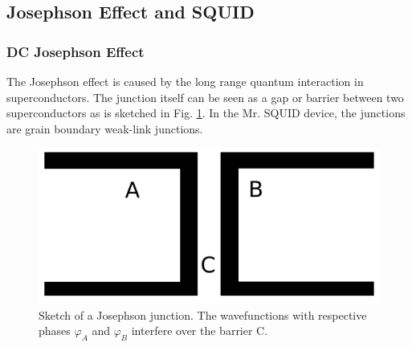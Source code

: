 \documentclass[a4paper,10pt]{article}
\begin{document}
\subsection{Josephson Effect and SQUID} %

\subsubsection*{DC Josephson Effect}
The Josephson effect is caused by the long range quantum interaction in superconductors. The junction itself can be seen as a gap or barrier between two superconductors as is sketched in Fig. \ref{figure_josephson_junction}. In the Mr. SQUID \cite{skriptum} device, the junctions are grain boundary weak-link junctions. 

\begin{figure}[htp!]
    \centering
    \includegraphics[width = 0.6 \textwidth]{josephson.png}
    \caption{Sketch of a Josephson junction. The wavefunctions with respective phases $\varphi_A$ and $\varphi_B$ interfere over the barrier C.}
    \label{figure_josephson_junction}
\end{figure}
\end{document}
